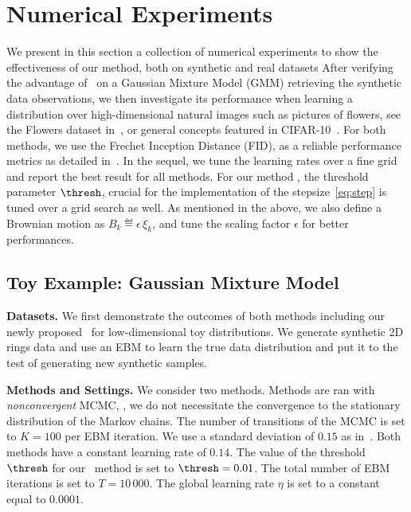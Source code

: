 \documentclass{article} %
\begin{document}
\section{Numerical Experiments}\label{sec:numericals}

We present in this section a collection of numerical experiments to show the effectiveness of our method, both on synthetic and real datasets
After verifying the advantage of \algo\ on a Gaussian Mixture Model (GMM) retrieving the synthetic data observations, we then investigate its performance when learning a distribution over high-dimensional natural images such as pictures of flowers, see the Flowers dataset in~\citet{nilsback2008automated}, or general concepts featured in CIFAR-10~\cite{krizhevsky2009learning}.
For both methods, we use the Frechet Inception Distance (FID), as a reliable performance metrics as detailed in~\citet{heusel2017gans}.
In the sequel, we tune the learning rates over a fine grid and report the best result for all methods.
For our method \algo, the threshold parameter $\thresh$, crucial for the implementation of the stepsize~\eqref{eq:step} is tuned over a grid search as well.
As mentioned in the above, we also define a Brownian motion as $B_k \eqdef \epsilon \, \xi_k$, and tune the scaling factor $\epsilon$ for better performances.

\subsection{Toy Example: Gaussian Mixture Model}

\quad \textbf{Datasets.}
We first demonstrate the outcomes of both methods including our newly proposed \algo\ for low-dimensional toy distributions.
We generate synthetic 2D rings data and use an EBM to learn the true data distribution and put it to the test of generating new synthetic samples.

\medskip
\textbf{Methods and Settings.}
We consider two methods. 
Methods are ran with \emph{nonconvergent} MCMC, \ie, we do not necessitate the convergence to the stationary distribution of the Markov chains.
The number of transitions of the MCMC is set to $K= 100$ per EBM iteration. 
We use a standard deviation of $0.15$ as in~\citet{nijkamp2020anatomy}.
Both methods have a constant learning rate of $0.14$.
The value of the threshold $\thresh$ for our \algo\ method is set to $\thresh = 0.01$.
The total number of EBM iterations is set to $T = 10\,000$.
The global learning rate $\eta$ is set to a constant equal to $0.0001$.
\end{document}

